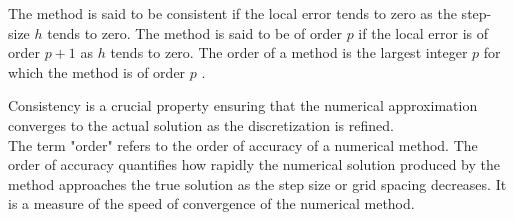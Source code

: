 \begin{enumerate}
    The method is said to be consistent if the local error tends to zero as the step-size $h$ tends to zero. The method is said to be of order $p$ if the local error is of order $p+1$ as $h$ tends to zero. The order of a method is the largest integer $p$ for which the method is of order $p$ \cite{isibor-2020}. 

  
Consistency is a crucial property ensuring that the numerical approximation converges to the actual solution as the discretization is refined. \\
The term "order" refers to the order of accuracy of a numerical method. The order of accuracy quantifies how rapidly the numerical solution produced by the method approaches the true solution as the step size or grid spacing decreases. It is a measure of the speed of convergence of the numerical method.

    


\end{enumerate}










